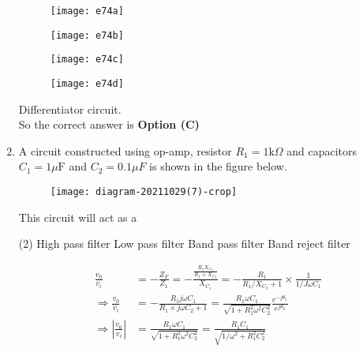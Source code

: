 \begin{enumerate}
\begin{tasks}
		\task[\textbf{A.}] \begin{figure}[H]
			\centering
			\texttt{[image: e74a]}
		\end{figure}
		\task[\textbf{B.}] \begin{figure}[H]
			\centering
			\texttt{[image: e74b]}
		\end{figure}
		\task[\textbf{C.}] \begin{figure}[H]
			\centering
			\texttt{[image: e74c]}
		\end{figure}
		\task[\textbf{D.}]\begin{figure}[H]
			\centering
			\texttt{[image: e74d]}
		\end{figure}
	\end{tasks}
\begin{answer}
	Differentiator circuit.\\
	So the correct answer is \textbf{Option (C)}
\end{answer}
	\item A circuit constructed using op-amp, resistor $R_{1}=1 \mathrm{k} \Omega$ and capacitors $C_{1}=1 \mu \mathrm{F}$ and $C_{2}=0.1 \mu F$ is shown in the figure below.\\
	\begin{figure}[H]
		\centering
		\texttt{[image: diagram-20211029(7)-crop]}
	\end{figure}
	This circuit will act as a
	{	}
	\begin{tasks}(2)
		\task[\textbf{A.}] High pass filter
		\task[\textbf{B.}] Low pass filter
		\task[\textbf{C.}] Band pass filter
		\task[\textbf{D.}] Band reject filter
	\end{tasks}
\begin{answer}
	\begin{align*}
	\frac{v_{0}}{v_{i}}&=-\frac{Z_{F}}{Z_{1}}=-\frac{\frac{R_{1} X_{C_{2}}}{R_{1}+X_{C_{2}}}}{X_{C_{1}}}=-\frac{R_{1}}{R_{1} / X_{C_{2}}+1} \times \frac{1}{1 / J \omega C_{1}}\\
	\Rightarrow \frac{v_{0}}{v_{i}}&=-\frac{R_{1} j \omega C_{1}}{R_{1} \times j \omega C_{2}+1}=\frac{R_{1} \omega C_{1}}{\sqrt{1+R_{1}^{2} \omega^{2} C_{2}^{2}}} \frac{e^{-j \theta_{1}}}{e^{j \theta_{2}}}\\
	\Rightarrow\left|\frac{v_{0}}{v_{i}}\right|&=\frac{R_{1} \omega C_{1}}{\sqrt{1+R_{1}^{2} \omega^{2} C_{2}^{2}}}=\frac{R_{1} C_{1}}{\sqrt{1 / \omega^{2}+R_{1}^{2} C_{2}^{2}}}\\

\end{align*}
\end{answer}
\end{enumerate}
